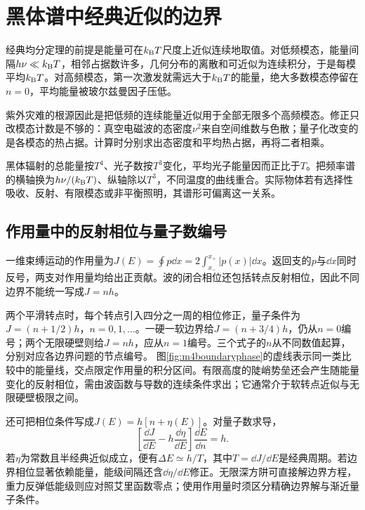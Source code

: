 \section{黑体谱中经典近似的边界}
经典均分定理的前提是能量可在$k_{\mathrm B} T$尺度上近似连续地取值。对低频模态，能量间隔$h\nu\ll k_{\mathrm B} T$，相邻占据数许多，几何分布的离散和可近似为连续积分，于是每模平均$k_{\mathrm B} T$。对高频模态，第一次激发就需远大于$k_{\mathrm B} T$的能量，绝大多数模态停留在$n=0$，平均能量被玻尔兹曼因子压低。

紫外灾难的根源因此是把低频的连续能量近似用于全部无限多个高频模态。修正只改模态计数是不够的：真空电磁波的态密度$\nu^2$来自空间维数与色散；量子化改变的是各模态的热占据。计算时分别求出态密度和平均热占据，再将二者相乘。

黑体辐射的总能量按$T^4$、光子数按$T^3$变化，平均光子能量因而正比于$T$。把频率谱的横轴换为$h\nu/(k_{\mathrm B} T)$、纵轴除以$T^3$，不同温度的曲线重合。实际物体若有选择性吸收、反射、有限模态或非平衡照明，其谱形可偏离这一关系。

\subsection{作用量中的反射相位与量子数编号}
一维束缚运动的作用量为$J(E)=\oint p\dd x=2\int_{x_-}^{x_+}|p(x)|\dd x$。返回支的$p$与$\dd x$同时反号，两支对作用量均给出正贡献。波的闭合相位还包括转点反射相位，因此不同边界不能统一写成$J=nh$。

两个平滑转点时，每个转点引入四分之一周的相位修正，量子条件为$J=(n+1/2)h$，$n=0,1,\ldots$。一硬一软边界给$J=(n+3/4)h$，仍从$n=0$编号；两个无限硬壁则给$J=nh$，应从$n=1$编号。三个式子的$n$从不同数值起算，分别对应各边界问题的节点编号。
图\ref{fig:m4boundaryphase}的虚线表示同一类比较中的能量线，交点限定作用量的积分区间。有限高度的陡峭势垒还会产生随能量变化的反射相位，需由波函数与导数的连续条件求出；它通常介于软转点近似与无限硬壁极限之间。

还可把相位条件写成$J(E)=h[n+\eta(E)]$。对量子数求导，
\[
 \left[\frac{\dd J}{\dd E}-h\frac{\dd\eta}{\dd E}\right]\frac{\dd E}{\dd n}=h.
\]
若$\eta$为常数且半经典近似成立，便有$\Delta E\simeq h/T$，其中$T=\dd J/\dd E$是经典周期。若边界相位显著依赖能量，能级间隔还含$\dd\eta/\dd E$修正。无限深方阱可直接解边界方程，重力反弹低能级则应对照艾里函数零点；使用作用量时须区分精确边界解与渐近量子条件。
